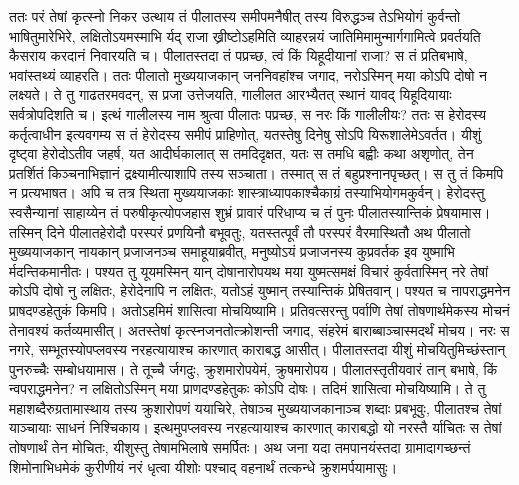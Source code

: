 \adhyAya
{}
\vakya ततः परं तेषां कृत्स्नो निकर उत्थाय तं पीलातस्य समीपमनैषीत्
\vakya तस्य विरुद्धञ्च तेऽभियोगं कुर्वन्तो भाषितुमारेभिरे, लक्षितोऽयमस्माभि र्यद् राजा ख्रीष्टोऽहमिति व्याहरन्नयं जातिमिमामुन्मार्गगामित्वे प्रवर्तयति कैसराय करदानं निवारयति च।
\vakya पीलातस्तदा तं पप्रच्छ, त्वं किं यिहूदीयानां राजा? स तं प्रतिबभाषे, भवांस्तथ्यं व्याहरति।
\vakya ततः पीलातो मुख्ययाजकान् जननिवहांश्च जगाद, नरोऽस्मिन् मया कोऽपि दोषो न लक्ष्यते।
\vakya ते तु गाढतरमवदन्, स प्रजा उत्तेजयति, गालीलत आरभ्यैतत् स्थानं यावद् यिहूदियायाः सर्वत्रोपदिशति च।
\vakya इत्थं गालीलस्य नाम श्रुत्वा पीलातः पप्रच्छ, स नरः किं गालीलीयः?
\vakya ततः स हेरोदस्य कर्तृत्वाधीन इत्यवगम्य स तं हेरोदस्य समीपं प्राहिणोत्, यतस्तेषु दिनेषु सोऽपि यिरूशालेमेऽवर्तत।
\vakya यीशुं दृष्ट्वा हेरोदोऽतीव जहर्ष, यत आदीर्घकालात् स तमदिदृक्षत, यतः स तमधि बह्वीः कथा अशृणोत्, तेन प्रतर्शितं किञ्चनाभिज्ञानं द्रक्ष्यामीत्याशापि तस्य सञ्चाता।
\vakya तस्मात् स तं बहुप्रश्नानपृच्छत्। स तु तं किमपि न प्रत्यभाषत।
\vakya अपि च तत्र स्थिता मुख्ययाजकाः शास्त्राध्यापकाश्चैकाग्रं तस्याभियोगमकुर्वन्।
\vakya हेरोदस्तु स्वसैन्यानां साहाय्येन तं परुषीकृत्योपजहास शुभ्रं प्रावारं परिधाप्य च तं पुनः पीलातस्यान्तिकं प्रेषयामास।
\vakya तस्मिन् दिने पीलातहेरोदौ परस्परं प्रणयिनौ बभूवतुः, यतस्तत्पूर्वं तौ परस्परं वैरमास्थितौ
\vakya अथ पीलातो मुख्ययाजकान् नायकान् प्रजाजनञ्च समाहूयाब्रवीत्,
\vakya मनुष्योऽयं प्रजाजनस्य कुप्रवर्तक इव युष्माभि र्मदन्तिकमानीतः।
\vakya पश्यत तु यूयमस्मिन् यान् दोषानारोपयथ मया युष्मत्समक्षं विचारं कुर्वतास्मिन् नरे तेषां कोऽपि दोषो नु लक्षितः, हेरोदेनापि न लक्षितः, यतोऽहं युष्मान् तस्यान्तिकं प्रेषितवान्। पश्यत च नापराद्धमनेन प्राषदण्डहेतुकं किमपि।
\vakya अतोऽहमिमं शासित्वा मोचयिष्यामि।
\vakya प्रतिवत्सरन्तु पर्वाणि तेषां तोषणार्थमेकस्य मोचनं तेनावश्यं कर्तव्यमासीत्।
\vakya अतस्तेषां कृत्स्नजनतोत्क्रोशन्ती जगाद, संहरेमं बाराब्बाञ्चास्मदर्थं मोचय।
\vakya नरः स नगरे, सम्भूतस्योपप्लवस्य नरहत्यायाश्च कारणात् काराबद्ध आसीत्।
\vakya पीलातस्तदा यीशुं मोचयितुमिच्छंस्तान् पुनरुच्चैः सम्बोधयामास।
\vakya ते तूच्चै र्जगदुः, क्रुशमारोपयेमं, क्रुषमारोपय।
\vakya पीलातस्तृतीयवारं तान् बभाषे, किं न्वपराद्धमनेन? न लक्षितोऽस्मिन् मया प्राणदण्डहेतुकः कोऽपि दोषः। तदिमं शासित्वा मोचयिष्यामि।
\vakya ते तु महाशब्दैरुग्रतामास्थाय तस्य क्रुशारोपणं ययाचिरे, तेषाञ्च मुख्ययाजकानाञ्च शब्दाः प्रबभूवुः,
\vakya पीलातश्च तेषां याञ्चायाः साधनं निश्चिकाय।
\vakya इत्थमुपप्लवस्य नरहत्यायाश्च कारणात् काराबद्धो यो नरस्तै र्याचितः स तेषां तोषणार्थं तेन मोचितः, यीशुस्तु तेषामभिलाषे समर्पितः।
\vakya अथ जना यदा तमपानयंस्तदा ग्रामादागच्छन्तं शिमोनाभिधमेकं कुरीणीयं नरं धृत्वा यीशोः पश्चाद् वहनार्थं तत्कन्धे क्रुशमर्पयामासुः।
